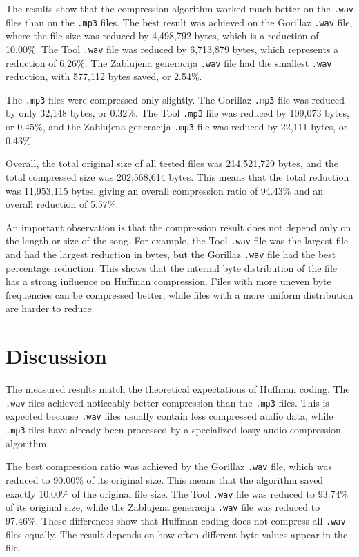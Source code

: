\documentclass[11pt,a4paper]{article}
\begin{document}
\noindent
The results show that the compression algorithm worked much better on the
\texttt{.wav} files than on the \texttt{.mp3} files. The best result was achieved
on the Gorillaz \texttt{.wav} file, where the file size was reduced by
4,498,792 bytes, which is a reduction of 10.00\%. The Tool \texttt{.wav} file was
reduced by 6,713,879 bytes, which represents a reduction of 6.26\%. The
Zablujena generacija \texttt{.wav} file had the smallest \texttt{.wav}
reduction, with 577,112 bytes saved, or 2.54\%.

The \texttt{.mp3} files were compressed only slightly. The Gorillaz
\texttt{.mp3} file was reduced by only 32,148 bytes, or 0.32\%. The Tool
\texttt{.mp3} file was reduced by 109,073 bytes, or 0.45\%, and the Zablujena
generacija \texttt{.mp3} file was reduced by 22,111 bytes, or 0.43\%.

Overall, the total original size of all tested files was 214,521,729 bytes, and
the total compressed size was 202,568,614 bytes. This means that the total
reduction was 11,953,115 bytes, giving an overall compression ratio of 94.43\%
and an overall reduction of 5.57\%.

An important observation is that the compression result does not depend only on
the length or size of the song. For example, the Tool \texttt{.wav} file was the
largest file and had the largest reduction in bytes, but the Gorillaz
\texttt{.wav} file had the best percentage reduction. This shows that the
internal byte distribution of the file has a strong influence on Huffman
compression. Files with more uneven byte frequencies can be compressed better,
while files with a more uniform distribution are harder to reduce.

\section{Discussion}

The measured results match the theoretical expectations of Huffman coding. The
\texttt{.wav} files achieved noticeably better compression than the
\texttt{.mp3} files. This is expected because \texttt{.wav} files usually contain
less compressed audio data, while \texttt{.mp3} files have already been processed
by a specialized lossy audio compression algorithm.

The best compression ratio was achieved by the Gorillaz \texttt{.wav} file,
which was reduced to 90.00\% of its original size. This means that the algorithm
saved exactly 10.00\% of the original file size. The Tool \texttt{.wav} file was
reduced to 93.74\% of its original size, while the Zablujena generacija
\texttt{.wav} file was reduced to 97.46\%. These differences show that Huffman
coding does not compress all \texttt{.wav} files equally. The result depends on
how often different byte values appear in the file.
\end{document}

